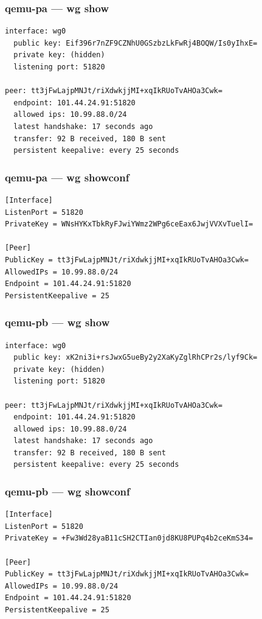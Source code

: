 \documentclass[11pt,a4paper]{article}
\begin{document}
\subsubsection*{qemu-pa — wg show}
\begin{lstlisting}
interface: wg0
  public key: Eif396r7nZF9CZNhU0GSzbzLkFwRj4BOQW/Is0yIhxE=
  private key: (hidden)
  listening port: 51820

peer: tt3jFwLajpMNJt/riXdwkjjMI+xqIkRUoTvAHOa3Cwk=
  endpoint: 101.44.24.91:51820
  allowed ips: 10.99.88.0/24
  latest handshake: 17 seconds ago
  transfer: 92 B received, 180 B sent
  persistent keepalive: every 25 seconds

\end{lstlisting}

\subsubsection*{qemu-pa — wg showconf}
\begin{lstlisting}
[Interface]
ListenPort = 51820
PrivateKey = WNsHYKxTbkRyFJwiYWmz2WPg6ceEax6JwjVVXvTuelI=

[Peer]
PublicKey = tt3jFwLajpMNJt/riXdwkjjMI+xqIkRUoTvAHOa3Cwk=
AllowedIPs = 10.99.88.0/24
Endpoint = 101.44.24.91:51820
PersistentKeepalive = 25

\end{lstlisting}

\subsubsection*{qemu-pb — wg show}
\begin{lstlisting}
interface: wg0
  public key: xK2ni3i+rsJwxG5ueBy2y2XaKyZglRhCPr2s/lyf9Ck=
  private key: (hidden)
  listening port: 51820

peer: tt3jFwLajpMNJt/riXdwkjjMI+xqIkRUoTvAHOa3Cwk=
  endpoint: 101.44.24.91:51820
  allowed ips: 10.99.88.0/24
  latest handshake: 17 seconds ago
  transfer: 92 B received, 180 B sent
  persistent keepalive: every 25 seconds

\end{lstlisting}

\subsubsection*{qemu-pb — wg showconf}
\begin{lstlisting}
[Interface]
ListenPort = 51820
PrivateKey = +Fw3Wd28yaB11cSH2CTIan0jd8KU8PUPq4b2ceKmS34=

[Peer]
PublicKey = tt3jFwLajpMNJt/riXdwkjjMI+xqIkRUoTvAHOa3Cwk=
AllowedIPs = 10.99.88.0/24
Endpoint = 101.44.24.91:51820
PersistentKeepalive = 25

\end{lstlisting}
\end{document}

